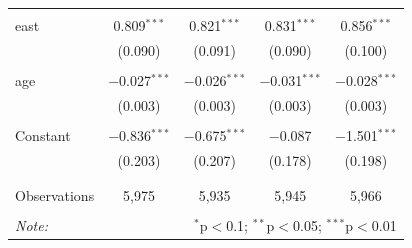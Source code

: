 \begin{table}[!htbp]
\begin{tabular}{@{\extracolsep{5pt}}lcccc}
  & & & & \\ 
 east & 0.809$^{***}$ & 0.821$^{***}$ & 0.831$^{***}$ & 0.856$^{***}$ \\ 
  & (0.090) & (0.091) & (0.090) & (0.100) \\ 
  & & & & \\ 
 age & $-$0.027$^{***}$ & $-$0.026$^{***}$ & $-$0.031$^{***}$ & $-$0.028$^{***}$ \\ 
  & (0.003) & (0.003) & (0.003) & (0.003) \\ 
  & & & & \\ 
 Constant & $-$0.836$^{***}$ & $-$0.675$^{***}$ & $-$0.087 & $-$1.501$^{***}$ \\ 
  & (0.203) & (0.207) & (0.178) & (0.198) \\ 
  & & & & \\ 
\hline \\[-1.8ex] 
Observations & 5,975 & 5,935 & 5,945 & 5,966 \\ 
\hline 
\hline \\[-1.8ex] 
\textit{Note:}  & \multicolumn{4}{r}{$^{*}$p$<$0.1; $^{**}$p$<$0.05; $^{***}$p$<$0.01} \\ 
\end{tabular} 
\end{table} 
